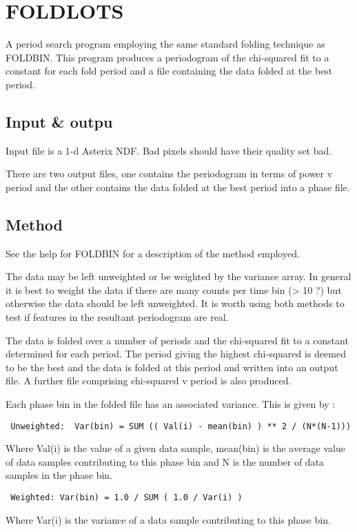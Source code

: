 \documentclass{book}
\renewcommand{\_}{{\tt\char'137}}     %
\begin{document}
\section{FOLDLOTS}
A period search program employing the same standard folding technique
as FOLDBIN. This program produces a periodogram of the chi-squared
fit to a constant for each fold period and a file containing the
data folded at the best period.
 
\subsection{Input \& outpu}
Input file is a 1-d Asterix NDF. Bad pixels should have their quality
set bad.
 
There are two output files, one contains the periodogram in terms
of power v period and the other contains the data folded at the
best period into a phase file.
 
\subsection{Method}
See the help for FOLDBIN for a description of the method employed.
 
The data may be left unweighted or be weighted by the variance array.
In general it is best to weight the data if there are many counts per
time bin (> 10 ?) but otherwise the data should be left unweighted.
It is worth using both methods to test if features in the resultant
periodogram are real.
 
The data is folded over a number of periods and the chi-squared
fit to a constant determined for each period. The period giving
the highest chi-squared is deemed to be the best and the
data is folded at this period and written into an output file.
A further file comprising chi-squared v period is also produced.
 
Each phase bin in the folded file has an associated variance.
This is given by :
\begin{verbatim}
 Unweighted:  Var(bin) = SUM (( Val(i) - mean(bin) ) ** 2 / (N*(N-1)))
\end{verbatim}
Where Val(i) is the value of a given data sample, mean(bin) is the
average value of data samples contributing to this phase bin and
N is the number of data samples in the phase bin.
 
\begin{verbatim}
 Weighted: Var(bin) = 1.0 / SUM ( 1.0 / Var(i) )
\end{verbatim}
Where Var(i) is the variance of a data sample contributing to this
phase bin.
 
\end{document}
